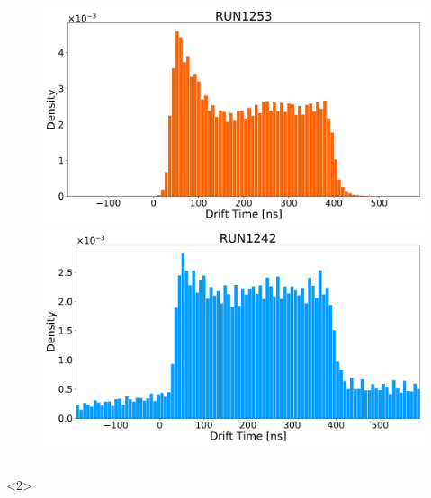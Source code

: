 \documentclass{beamer}
\begin{document}
\begin{frame}
{\begin{columns}
\begin{column}{0.5\textwidth}
					\begin{figure}
						\centering 
						\includegraphics[width=1.0\textwidth]	{./Images/1253_orange.pdf}
						\includegraphics[width=1.0\textwidth]{./Images/1242_blue.pdf}
					\end{figure}

			\end{column}
		\end{columns}
		}<2>

\end{frame}
\end{document}
